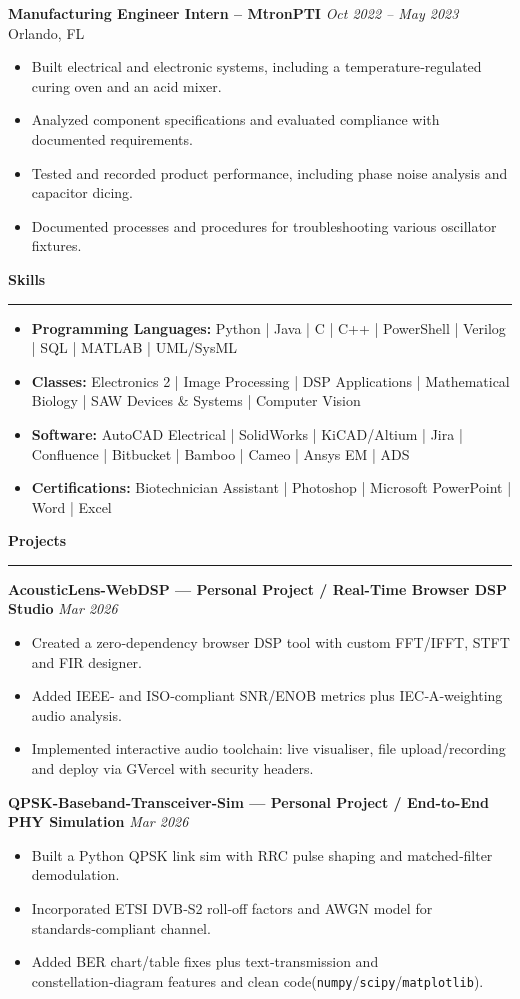 \documentclass[9pt,letterpaper]{article}
\newcommand{\sectionHeading}[1]{%
  \noindent\textbf{\large\textcolor{myblue}{#1}}%
  \par\vspace{-1.5ex}%
  \noindent\textcolor{myblue}{\rule{\linewidth}{0.7pt}}%
}
\begin{document}
\textbf{Manufacturing Engineer Intern -- MtronPTI}
\hfill \textit{Oct 2022 -- May 2023}\\
Orlando, FL
\begin{itemize}
  \item Built electrical and electronic systems, including a temperature‐regulated curing oven and an acid mixer.
  \item Analyzed component specifications and evaluated compliance with documented requirements.
  \item Tested and recorded product performance, including phase noise analysis and capacitor dicing.
  \item Documented processes and procedures for troubleshooting various oscillator fixtures.
\end{itemize}

\sectionHeading{Skills}
{\small
\begin{itemize}
  \item \textbf{Programming Languages:} Python | Java | C | C++ | PowerShell | Verilog | SQL | MATLAB | UML/SysML
  \item \textbf{Classes:} Electronics 2 | Image Processing | DSP Applications | Mathematical Biology | SAW Devices \& Systems | Computer Vision
  \item \textbf{Software:} AutoCAD Electrical
  | SolidWorks | KiCAD/Altium | Jira | Confluence | Bitbucket | Bamboo | Cameo | Ansys EM | ADS
  \item \textbf{Certifications:} Biotechnician Assistant | Photoshop | Microsoft PowerPoint | Word | Excel
\end{itemize}
}

\sectionHeading{Projects}

\textbf{AcousticLens-WebDSP — Personal Project / Real-Time Browser DSP Studio}
\hfill \textit{Mar 2026}
\begin{itemize}
  \item Created a zero‑dependency browser DSP tool with custom FFT/IFFT, STFT and FIR designer.
  \item Added IEEE‑ and ISO‑compliant SNR/ENOB metrics plus IEC‑A‑weighting audio analysis.
  \item Implemented interactive audio toolchain: live visualiser, file upload/recording and deploy via GVercel with security headers.
\end{itemize}

\textbf{QPSK-Baseband-Transceiver-Sim — Personal Project / End-to-End PHY Simulation}
\hfill \textit{Mar 2026}
\begin{itemize}
  \item Built a Python QPSK link sim with RRC pulse shaping and matched‑filter demodulation.
  \item Incorporated ETSI DVB‑S2 roll‑off factors and AWGN model for standards‑compliant channel.
  \item Added BER chart/table fixes plus text‑transmission and constellation‑diagram features and clean code(\texttt{numpy}/\texttt{scipy}/\texttt{matplotlib}).
\end{itemize}
\end{document}
